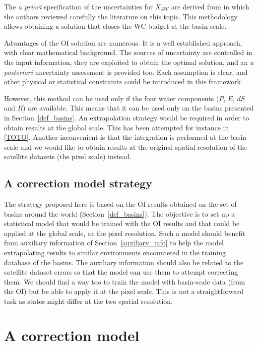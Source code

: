 \documentclass[draft]{agujournal2019}
\begin{document}
The {\it a priori} specification of the uncertainties for $X_{SW}$ are derived from \cite{Dorigo2021} in which the authors reviewed carefully the literature on this topic.
This methodology allows obtaining a solution that closes the WC budget at the basin scale.

Advantages of the OI solution are numerous. It is a well established approach, with clear mathematical background. The sources of uncertainty are controlled in the input information, they are exploited to obtain the optimal solution, and an {\it a posteriori} uncertainty assessment is provided too. Each assumption is clear, and other physical or statistical constraints could be introduced in this framework. 

However, this method can be used only if the four water components ($P$, $E$, $dS$ and $R$) are available. This means that it can be used only on the basins presented in Section~\ref{def_basins}. An extrapolation strategy would be required in order to obtain results at the global scale. This has been attempted for instance in \ref{TOTO}. Another inconvenient is that the integration is performed at the basin scale and we would like to obtain results at the original spatial resolution of the satellite datasets (the pixel scale) instead.

\subsection{A correction model strategy}
The strategy proposed here is based on the OI results obtained on the set of basins around the world (Section~\ref{def_basins}). The objective is to set up a statistical model that would be trained with the OI results and that could be applied at the global scale, at the pixel resolution. Such a model should benefit from auxiliary information of Section~\ref{auxiliary_info} to help the model extrapolating results to similar environments encountered in the training database of the basins. The auxiliary information should also be related to the satellite dataset errors so that the model can use them to attempt correcting them. We should find a way too to train the model with basin-scale data (from the OI) but be able to apply it at the pixel scale. This is not a straightforward task as states might differ at the two spatial resolution.



\section{A correction model}
\end{document}
